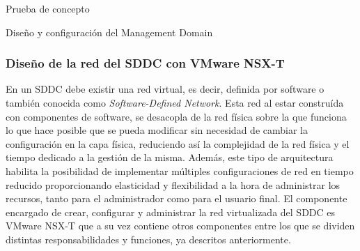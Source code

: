 \begin{section}{Prueba de concepto}
\begin{subsection}{Diseño y configuración del Management Domain}
    \subsubsection{Diseño de la red del SDDC con VMware NSX-T}
    En un SDDC debe existir una red virtual, es decir, definida por software o también conocida como \textit{Software-Defined Network}. Esta red al estar construída con componentes de software, se desacopla de la red física sobre la que funciona lo que hace posible que se pueda modificar sin necesidad de cambiar la configuración en la capa física, reduciendo así la complejidad de la red física y el tiempo dedicado a la gestión de la misma. Además, este tipo de arquitectura habilita la posibilidad de implementar múltiples configuraciones de red en tiempo reducido proporcionando elasticidad y flexibilidad a la hora de administrar los recursos, tanto para el administrador como para el usuario final.
    El componente encargado de crear, configurar y administrar la red virtualizada del SDDC es VMware NSX-T que a su vez contiene otros componentes entre los que se dividen distintas responsabilidades y funciones, ya descritos anteriormente.
    
    

\end{subsection}
\end{section}
